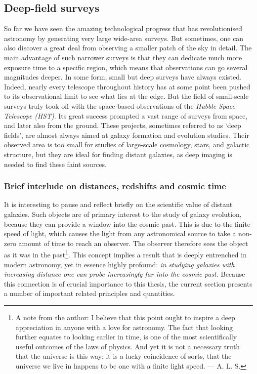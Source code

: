 \subsection{Deep-field surveys}\label{subsection:deep_field_surveys}
So far we have seen the amazing technological progress that has revolutionised astronomy by generating very large wide-area surveys. But sometimes, one can also discover a great deal from observing a smaller patch of the sky in detail. The main advantage of such narrower surveys is that they can dedicate much more exposure time to a specific region, which means that observations can go several magnitudes deeper. In some form, small but deep surveys have always existed. Indeed, nearly every telescope throughout history has at some point been pushed to its observational limit to see what lies at the edge. But the field of small-scale surveys truly took off with the space-based observations of the \textit{Hubble Space Telescope (HST)}. Its great success prompted a vast range of surveys from space, and later also from the ground. These projects, sometimes referred to as `deep fields', are almost always aimed at galaxy formation and evolution studies. Their observed area is too small for studies of large-scale cosmology, stars, and galactic structure, but they are ideal for finding distant galaxies, as deep imaging is needed to find these faint sources. \par


\subsubsection{Brief interlude on distances, redshifts and cosmic time}\label{subsubsection:redshift_interlude}
It is interesting to pause and reflect briefly on the scientific value of distant galaxies. Such objects are of primary interest to the study of galaxy evolution, because they can provide a window into the cosmic past. This is due to the finite speed of light, which causes the light from any astronomical source to take a non-zero amount of time to reach an observer. The observer therefore sees the object as it was in the past\footnote{A note from the author: I believe that this point ought to inspire a deep appreciation in anyone with a love for astronomy. The fact that looking further equates to looking earlier in time, is one of the most scientifically useful outcomes of the laws of physics. And yet it is not a necessary truth that the universe is this way; it is a lucky coincidence of sorts, that the universe we live in happens to be one with a finite light speed. --- A. L. S.}. This concept implies a result that is deeply entrenched in modern astronomy, yet in essence highly profound: \textit{in studying galaxies with increasing distance one can probe increasingly far into the cosmic past.} Because this connection is of crucial importance to this thesis, the current section presents a number of important related principles and quantities. \par


